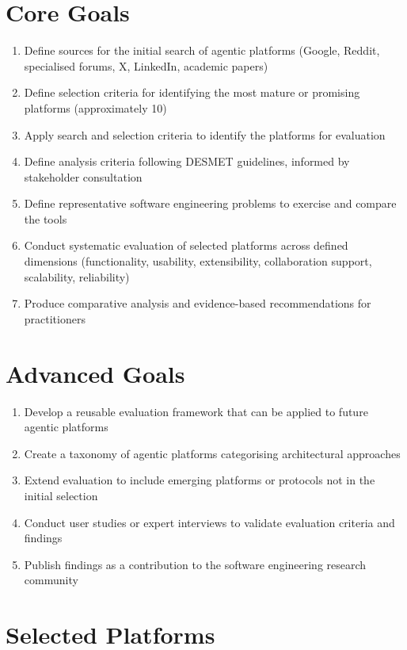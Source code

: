 \documentclass[]
{UCD_CS_FYP_Report}
\begin{document}
\section{Core Goals}
\begin{enumerate}
  \item Define sources for the initial search of agentic platforms (Google, Reddit, specialised forums, X, LinkedIn, academic papers)
  \item Define selection criteria for identifying the most mature or promising platforms (approximately 10)
  \item Apply search and selection criteria to identify the platforms for evaluation
  \item Define analysis criteria following DESMET guidelines, informed by stakeholder consultation
  \item Define representative software engineering problems to exercise and compare the tools
  \item Conduct systematic evaluation of selected platforms across defined dimensions (functionality, usability, extensibility, collaboration support, scalability, reliability)
  \item Produce comparative analysis and evidence-based recommendations for practitioners
\end{enumerate}

\section{Advanced Goals}
\begin{enumerate}
  \item Develop a reusable evaluation framework that can be applied to future agentic platforms
  \item Create a taxonomy of agentic platforms categorising architectural approaches
  \item Extend evaluation to include emerging platforms or protocols not in the initial selection
  \item Conduct user studies or expert interviews to validate evaluation criteria and findings
  \item Publish findings as a contribution to the software engineering research community
\end{enumerate}

\section{Selected Platforms}
\end{document}
